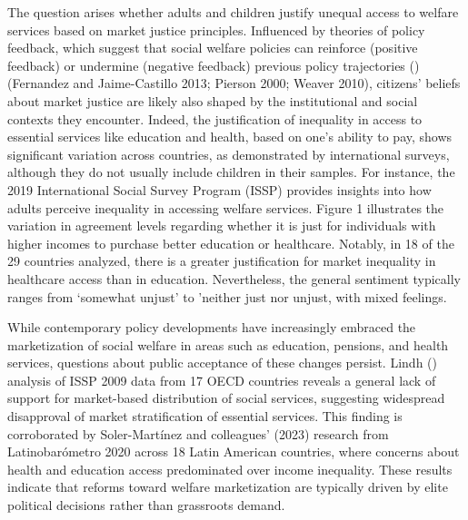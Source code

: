 \documentclass[
  letterpaper,
  DIV=11,
  numbers=noendperiod]{scrartcl}
\begin{document}
The question arises whether adults and children justify unequal access
to welfare services based on market justice principles. Influenced by
theories of policy feedback, which suggest that social welfare policies
can reinforce (positive feedback) or undermine (negative feedback)
previous policy trajectories
() (Fernandez and Jaime-Castillo 2013; Pierson 2000; Weaver 2010),
citizens' beliefs about market justice are likely also shaped by the
institutional and social contexts they encounter. Indeed, the
justification of inequality in access to essential services like
education and health, based on one's ability to pay, shows significant
variation across countries, as demonstrated by international surveys,
although they do not usually include children in their samples. For
instance, the 2019 International Social Survey Program (ISSP) provides
insights into how adults perceive inequality in accessing welfare
services. Figure 1 illustrates the variation in agreement levels
regarding whether it is just for individuals with higher incomes to
purchase better education or healthcare. Notably, in 18 of the 29
countries analyzed, there is a greater justification for market
inequality in healthcare access than in education. Nevertheless, the
general sentiment typically ranges from `somewhat unjust' to 'neither
just nor unjust, with mixed feelings.

While contemporary policy developments have increasingly embraced the
marketization of social welfare in areas such as education, pensions,
and health services, questions about public acceptance of these changes
persist. Lindh () analysis of ISSP
2009 data from 17 OECD countries reveals a general lack of support for
market-based distribution of social services, suggesting widespread
disapproval of market stratification of essential services. This finding
is corroborated by Soler-Martínez and colleagues' (2023) research from
Latinobarómetro 2020 across 18 Latin American countries, where concerns
about health and education access predominated over income inequality.
These results indicate that reforms toward welfare marketization are
typically driven by elite political decisions rather than grassroots
demand.~
\end{document}
